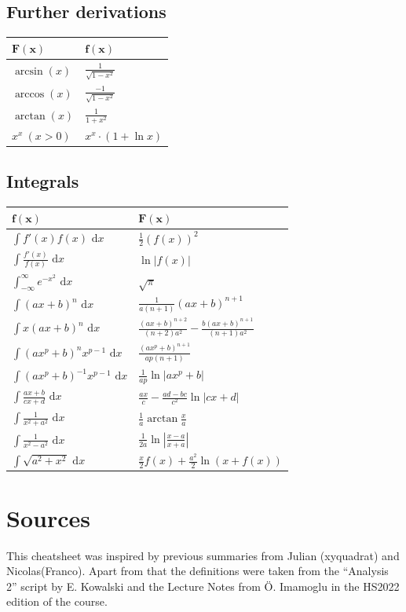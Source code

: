 \documentclass[a4paper,fontsize = 8pt]{scrartcl}
\def\dx{\text{ d}x}
\begin{document}
\subsection{Further derivations}
\begin{center}
  \begin{tabularx}{\linewidth}{>{\centering\arraybackslash}X>{\centering\arraybackslash}X}
    \toprule
    $\mathbf{F(x)}$ & $\mathbf{f(x)}$ \\
    \midrule
    $\arcsin(x)$ & $\frac{1}{\sqrt{1 - x^2}}$ \\
    $\arccos(x)$ & $\frac{-1}{\sqrt{1 - x^2}}$ \\
    $\arctan(x)$ & $\frac{1}{1 + x^2}$ \\ 
    $x^x \ (x > 0)$ & $x^x \cdot (1 + \ln x)$ \\
    \bottomrule
  \end{tabularx}
\end{center}
\subsection{Integrals}
\begin{center}
  \begin{tabularx}{\linewidth}{>{\centering\arraybackslash}X>{\centering\arraybackslash}X}
    \toprule
    $\mathbf{f(x)}$ & $\mathbf{F(x)}$ \\
    \midrule
    $\int f'(x) f(x) \dx$ & $\frac{1}{2}(f(x))^2$ \\
    $\int \frac{f'(x)}{f(x)} \dx$ & $\ln|f(x)|$ \\
    $\int_{-\infty}^\infty e^{-x^2} \dx$ & $\sqrt{\pi}$ \\
    $\int (ax+b)^n \dx$ & $\frac{1}{a(n+1)}(ax+b)^{n+1}$ \\
    $\int x(ax+b)^n \dx$ & $\frac{(ax+b)^{n+2}}{(n+2)a^2} - \frac{b(ax+b)^{n+1}}{(n+1)a^2}$ \\
    $\int (ax^p+b)^n x^{p-1} \dx$ & $\frac{(ax^p+b)^{n+1}}{ap(n+1)}$ \\
    $\int (ax^p + b)^{-1} x^{p-1} \dx$ & $\frac{1}{ap} \ln |ax^p + b|$ \\
    $\int \frac{ax+b}{cx+d} \dx$ & $\frac{ax}{c} - \frac{ad-bc}{c^2} \ln |cx +d|$ \\
    $\int \frac{1}{x^2+a^2} \dx$ & $\frac{1}{a} \arctan \frac{x}{a}$ \\
    $\int \frac{1}{x^2 - a^2} \dx$ & $\frac{1}{2a} \ln\left| \frac{x-a}{x+a} \right|$ \\
    $\int \sqrt{a^2+x^2} \dx $ & $\frac{x}{2}f(x) + \frac{a^2}{2}\ln(x+f(x))$ \\
    \bottomrule
  \end{tabularx}
\end{center}

\endgroup
\section{Sources}
This cheatsheet was inspired by previous summaries from Julian (xyquadrat) and Nicolas(Franco). Apart from that the definitions were taken from the ``Analysis 2'' script by E. Kowalski and the Lecture Notes from Ö. Imamoglu in the HS2022 edition of the course.
\end{document}
